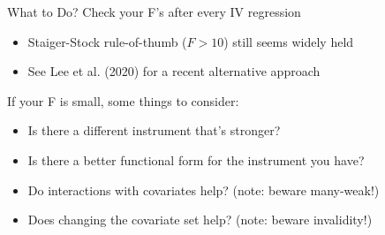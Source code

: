 \documentclass{beamer}
\begin{document}
\begin{frame}{What to Do?}
Check your F's after every IV regression\smallskip
\begin{itemize}
\item Staiger-Stock rule-of-thumb ($F>10$) still seems widely held\smallskip
\item See Lee et al. (2020) for a recent alternative approach
\end{itemize}
\bigskip

If your F is small, some things to consider:\smallskip
\begin{itemize}
\item Is there a different instrument that's stronger?\smallskip
\item Is there a better functional form for the instrument you have?\smallskip
\item Do interactions with covariates help? (note: beware many-weak!)\smallskip
\item Does changing the covariate set help? (note: beware invalidity!)
\end{itemize}
\end{frame}
\end{document}
